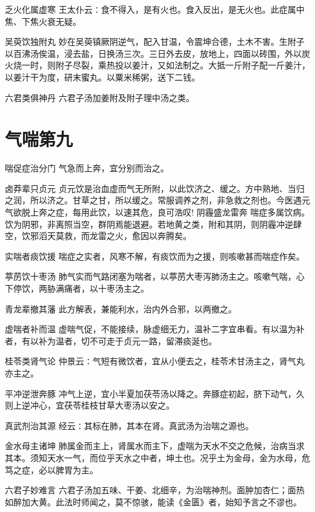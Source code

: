 \documentclass[a4paper,12pt,UTF8,twoside]{ctexbook}
\begin{document}
    乏火化属虚寒
    王太仆云∶食不得入，是有火也。食入反出，是无火也。此症属中焦、下焦火衰无疑。
    
    吴萸饮独附丸
    妙在吴萸镇厥阴逆气，配入甘温，令震坤合德，土木不害。生附子以百沸汤俟温，浸去盐，日换汤三次。三日外去皮，放地上，四面以砖围，外以炭火烧一时，则附子尽裂，乘热投以姜汁，又如法制之。大抵一斤附子配一斤姜汁，以姜汁干为度，研末蜜丸。以粟米稀粥，送下二钱。
    
    六君类俱神丹
    六君子汤加姜附及附子理中汤之类。
    
  \chapter{气喘第九}
    喘促症治分门
    气急而上奔，宜分别而治之。
    
    卤莽辈只贞元
    贞元饮是治血虚而气无所附，以此饮济之、缓之。方中熟地、当归之润，所以济之。甘草之甘，所以缓之。常服调养之剂，非急救之剂也。今医遇元气欲脱上奔之症，每用此饮，以速其危，良可浩叹!
    阴霾盛龙雷奔
    喘症多属饮病。饮为阴邪，非离照当空，群阴焉能退避。若地黄之类，附和其阴，则阴霾冲逆肆空，饮邪滔天莫救，而龙雷之火，愈因以奔腾矣。
    
    实喘者痰饮援
    喘症之实者，风寒不解，有痰饮而为之援，则咳嗽甚而喘症作矣。
    
    葶苈饮十枣汤
    肺气实而气路闭塞为喘者，以葶苈大枣泻肺汤主之。咳嗽气喘，心下停饮，两胁满痛者，以十枣汤主之。
    
    青龙辈撤其藩
    此方解表，兼能利水，治内外合邪，以两撤之。
    
    虚喘者补而温
    虚喘气促，不能接续，脉虚细无力，温补二字宜串看。有以温为补者，有以补为温者，切不可走于贞元一路，留滞痰涎也。
    
    桂苓类肾气论
    仲景云∶气短有微饮者，宜从小便去之，桂苓术甘汤主之，肾气丸亦主之。
    
    平冲逆泄奔豚
    冲气上逆，宜小半夏加茯苓汤以降之。奔豚症初起，脐下动气，久则上逆冲心，宜茯苓桂枝甘草大枣汤以安之。
    
    真武剂治其源
    经云∶其标在肺，其本在肾。真武汤为治喘之源也。
    
    金水母主诸坤
    肺属金而主上，肾属水而主下，虚喘为天水不交之危候，治病当求其本。须知天水一气，而位乎天水之中者，坤土也。况乎土为金母，金为水母，危笃之症，必以脾胃为主。
    
    六君子妙难言
    六君子汤加五味、干姜、北细辛，为治喘神剂。面肿加杏仁；面热如醉加大黄。此法时师闻之，莫不惊骇，能读《金匮》者，始知予言之不谬也。
    
\end{document}
